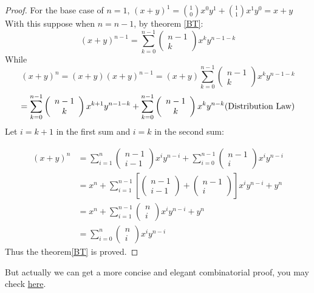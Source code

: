         \begin{proof}
            For the base case of $n = 1$, $(x+y)^1 = \binom{1}{0} x^0y^1 + \binom{1}{1}x^1y^0 = x+y$
            With this suppose when $n = n- 1$, by theorem \ref{BT}:
            $$(x+y)^{n-1} = \sum_{k=0}^{n-1}\left(\begin{array}{c}n-1 \\k\end{array}\right) x^{k} y^{n-1-k}$$ While $$(x+y)^n = (x+y)(x+y)^{n-1} = (x+y)\sum_{k=0}^{n-1}\left(\begin{array}{c}n-1 \\k\end{array}\right) x^{k} y^{n-1-k}$$$$= \sum_{k=0}^{n-1}\left(\begin{array}{c}n-1 \\k\end{array}\right) x^{k+1} y^{n-1-k} + \sum_{k=0}^{n-1}\left(\begin{array}{c}n-1 \\k\end{array}\right) x^{k} y^{n-k} \space \text{(Distribution Law)}$$
            Let $i = k+1$ in the first sum and $i=k$ in the second sum:
            
            $$\begin{aligned}(x+y)^{n} & =\sum_{i=1}^{n}\left(\begin{array}{c}n-1 \\i-1\end{array}\right) x^{i} y^{n-i}+\sum_{i=0}^{n-1}\left(\begin{array}{c}n-1 \\i\end{array}\right) x^{i} y^{n-i} \\& =x^{n}+\sum_{i=1}^{n-1}\left[\left(\begin{array}{c}n-1 \\i-1\end{array}\right)+\left(\begin{array}{c}n-1 \\i\end{array}\right)\right] x^{i} y^{n-i}+y^{n} \\& =x^{n}+\sum_{i=1}^{n-1}\left(\begin{array}{c}n \\i\end{array}\right) x^{i} y^{n-i}+y^{n} \\& =\sum_{i=0}^{n}\left(\begin{array}{c}n \\i\end{array}\right) x^{i} y^{n-i}\end{aligned}$$
            Thus the theorem\ref{BT} is proved.
        \end{proof}
        But actually we can get a more concise and elegant combinatorial proof, you may check 
        \href{https://artofproblemsolving.com/wiki/index.php/Binomial_Theorem}{here}.

